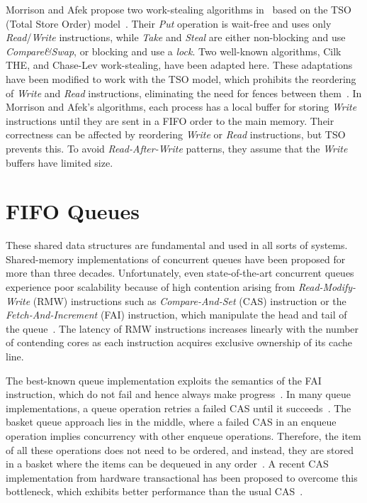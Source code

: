 Morrison and Afek propose two work-stealing algorithms in~\cite{fencefreeworkproceedings} based on the TSO (Total Store Order) model~\cite{DBLP_journals_cacm_SewellSONM10}. Their \emph{Put} operation is wait-free and uses only \emph{Read}/\emph{Write} instructions, while \emph{Take} and \emph{Steal} are either non-blocking and use \emph{Compare\&Swap}, or blocking and use a \emph{lock}. Two well-known algorithms, Cilk THE, and Chase-Lev work-stealing, have been adapted here. These adaptations have been modified to work with the TSO model, which prohibits the reordering of \emph{Write} and \emph{Read} instructions, eliminating the need for fences between them~\cite{circular.work.stealing, DBLP_conf_pldi_FrigoLR98}. In Morrison and Afek's algorithms, each process has a local buffer for storing \emph{Write} instructions until they are sent in a FIFO order to the main memory. Their correctness can be affected by reordering \emph{Write} or \emph{Read} instructions, but TSO prevents this. To avoid \emph{Read-After-Write} patterns, they assume that the \emph{Write} buffers have limited size.


\section{\label{section:FIFO-queues}FIFO Queues}

These shared data structures are fundamental and used in all sorts of systems. Shared-memory implementations of concurrent queues have been proposed for more than three decades. Unfortunately, even state-of-the-art concurrent queues experience poor scalability because of high contention arising from \emph{Read-Modify-Write} (RMW) instructions such as \emph{Compare-And-Set} (CAS) instruction or the \emph{Fetch-And-Increment} (FAI) instruction, which manipulate the head and tail of the queue~\cite{DBLP_conf_spaa_FatourouK11, DBLP_conf_ppopp_FatourouK12, basketqueue2007, DBLP_conf_ppopp_KoganP11, DBLP_journals_dc_Ladan-MozesS08, DBLP_conf_podc_MichaelS96, DBLP_journals_topc_Milman-SelaKLLP22, DBLP_conf_ppopp_YangM16}. The latency of RMW instructions increases linearly with the number of contending cores as each instruction acquires exclusive ownership of its cache line.

The best-known queue implementation exploits the semantics of the FAI instruction, which do not fail and hence always make progress~\cite{ppopp2013x86queues, DBLP_conf_ppopp_YangM16}. In many queue implementations, a queue operation retries a failed CAS until it succeeds~\cite{DBLP_conf_spaa_FatourouK11, DBLP_conf_ppopp_FatourouK12, basketqueue2007, DBLP_conf_ppopp_KoganP11, DBLP_journals_dc_Ladan-MozesS08, DBLP_conf_ppopp_YangM16}. The basket queue approach lies in the middle, where a failed CAS in an enqueue operation implies concurrency with other enqueue operations. Therefore, the item of all these operations does not need to be ordered, and instead, they are stored in a basket where the items can be dequeued in any order~\cite{basketqueue2007}. A recent CAS implementation from hardware transactional has been proposed to overcome this bottleneck, which exhibits better performance than the usual CAS~\cite{scalingconcurrent2020}.

